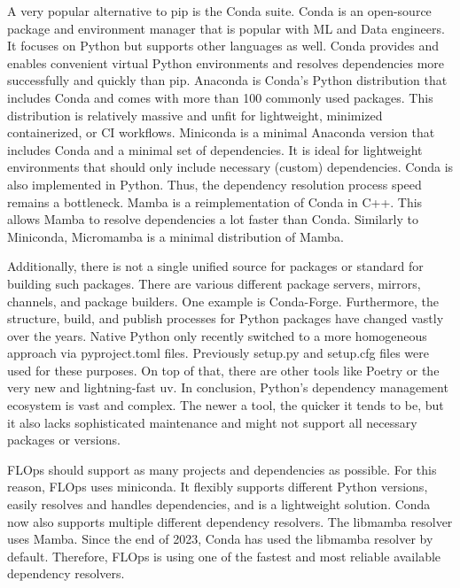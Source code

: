 A very popular alternative to pip is the Conda suite.
Conda \cite{docs:conda} is an open-source package and environment manager that is popular with ML and Data engineers.
It focuses on Python but supports other languages as well.
Conda provides and enables convenient virtual Python environments and resolves dependencies more successfully and quickly than pip.
Anaconda \cite{docs:anaconda} is Conda's Python distribution that includes Conda and comes with more than 100 commonly used packages.
This distribution is relatively massive and unfit for lightweight, minimized containerized, or CI workflows.
Miniconda \cite{docs:miniconda} is a minimal Anaconda version that includes Conda and a minimal set of dependencies.
It is ideal for lightweight environments that should only include necessary (custom) dependencies.
Conda is also implemented in Python.
Thus, the dependency resolution process speed remains a bottleneck.
Mamba \cite{docs:mamba} is a reimplementation of Conda in C++.
This allows Mamba to resolve dependencies a lot faster than Conda.
Similarly to Miniconda, Micromamba \cite{docs:micromamba} is a minimal distribution of Mamba.

Additionally, there is not a single unified source for packages or standard for building such packages.
There are various different package servers, mirrors, channels, and package builders.
One example is Conda-Forge.
Furthermore, the structure, build, and publish processes for Python packages have changed vastly over the years.
Native Python only recently switched to a more homogeneous approach via pyproject.toml files.
Previously setup.py and setup.cfg files were used for these purposes.
On top of that, there are other tools like Poetry or the very new and lightning-fast uv.
In conclusion, Python's dependency management ecosystem is vast and complex.
The newer a tool, the quicker it tends to be, but it also lacks sophisticated maintenance and might not support all necessary packages or versions.

FLOps should support as many projects and dependencies as possible.
For this reason, FLOps uses miniconda.
It flexibly supports different Python versions, easily resolves and handles dependencies, and is a lightweight solution.
Conda now also supports multiple different dependency resolvers.
The libmamba resolver uses Mamba.
Since the end of 2023, Conda has used the libmamba resolver by default.
Therefore, FLOps is using one of the fastest and most reliable available dependency resolvers.

